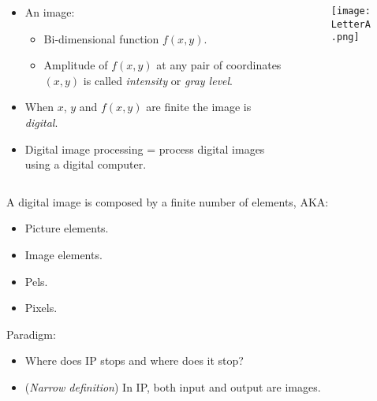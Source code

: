 \begin{frame}
\begin{columns}[T]
\begin{column}{.6\textwidth}
\begin{itemize}
\item An image:
\begin{itemize}
\item Bi-dimensional function $f(x,y)$.
\item Amplitude of $f(x,y)$ at any pair of coordinates $(x,y)$ is called \textit{intensity} or \textit{gray level}.
\end{itemize}
\item When $x$, $y$ and $f(x,y)$ are finite	the image is \textit{digital}.
\item Digital image processing = process digital images using a digital computer.
\end{itemize}
\end{column}
\begin{column}{.4\textwidth}
\begin{figure}
\texttt{[image: LetterA.png]}
\end{figure}
\end{column}
\end{columns}
\end{frame}


\begin{frame}
A digital image is composed by a finite number of elements, AKA:
\begin{itemize}
\item Picture elements.
\item Image elements.
\item Pels.
\item Pixels.
\end{itemize}
Paradigm:
\begin{itemize}
\item Where does IP stops and where does it stop?
\item (\textit{Narrow definition}) In IP, both input and output are images.
\end{itemize}
\end{frame}


